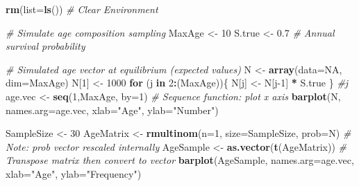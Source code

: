 \documentclass[
]{krantz}
\makeatletter
\newenvironment{Shaded}{\begin{snugshade}}{\end{snugshade}}
\newcommand{\AttributeTok}[1]{\textcolor[rgb]{0.27,0.27,0.27}{#1}}
\newcommand{\CommentTok}[1]{\textcolor[rgb]{0.37,0.37,0.37}{\textit{#1}}}
\newcommand{\ConstantTok}[1]{\textcolor[rgb]{0.37,0.37,0.37}{#1}}
\newcommand{\ControlFlowTok}[1]{\textcolor[rgb]{0.27,0.27,0.27}{\textbf{#1}}}
\newcommand{\DecValTok}[1]{\textcolor[rgb]{0.06,0.06,0.06}{#1}}
\newcommand{\FloatTok}[1]{\textcolor[rgb]{0.06,0.06,0.06}{#1}}
\newcommand{\FunctionTok}[1]{\textcolor[rgb]{0.27,0.27,0.27}{\textbf{#1}}}
\newcommand{\NormalTok}[1]{#1}
\newcommand{\OtherTok}[1]{\textcolor[rgb]{0.37,0.37,0.37}{#1}}
\newcommand{\SpecialCharTok}[1]{\textcolor[rgb]{0.43,0.43,0.43}{\textbf{#1}}}
\newcommand{\StringTok}[1]{\textcolor[rgb]{0.5,0.5,0.5}{#1}}
\newenvironment{kframe}{%
\medskip{}
\setlength{\fboxsep}{.8em}
 \def\at@end@of@kframe{}%
 \ifinner\ifhmode%
  \def\at@end@of@kframe{\end{minipage}}%
  \begin{minipage}{\columnwidth}%
 \fi\fi%
 \def\FrameCommand##1{\hskip\@totalleftmargin \hskip-\fboxsep
 \colorbox{shadecolor}{##1}\hskip-\fboxsep
     \hskip-\linewidth \hskip-\@totalleftmargin \hskip\columnwidth}%
 \MakeFramed {\advance\hsize-\width
   \@totalleftmargin\z@ \linewidth\hsize
   \@setminipage}}%
 {\par\unskip\endMakeFramed%
 \at@end@of@kframe}
\renewenvironment{Shaded}{\begin{kframe}}{\end{kframe}}
\makeatother
\begin{document}
\begin{Shaded}
\begin{Highlighting}[]
\FunctionTok{rm}\NormalTok{(}\AttributeTok{list=}\FunctionTok{ls}\NormalTok{()) }\CommentTok{\# Clear Environment}

\CommentTok{\# Simulate age composition sampling}
\NormalTok{MaxAge }\OtherTok{\textless{}{-}} \DecValTok{10}
\NormalTok{S.true }\OtherTok{\textless{}{-}} \FloatTok{0.7} \CommentTok{\# Annual survival probability}

\CommentTok{\# Simulated age vector at equilibrium (expected values)}
\NormalTok{N }\OtherTok{\textless{}{-}} \FunctionTok{array}\NormalTok{(}\AttributeTok{data=}\ConstantTok{NA}\NormalTok{, }\AttributeTok{dim=}\NormalTok{MaxAge)}
\NormalTok{N[}\DecValTok{1}\NormalTok{] }\OtherTok{\textless{}{-}} \DecValTok{1000}
\ControlFlowTok{for}\NormalTok{ (j }\ControlFlowTok{in} \DecValTok{2}\SpecialCharTok{:}\NormalTok{(MaxAge))\{}
\NormalTok{  N[j] }\OtherTok{\textless{}{-}}\NormalTok{ N[j}\DecValTok{{-}1}\NormalTok{] }\SpecialCharTok{*}\NormalTok{ S.true}
\NormalTok{\} }\CommentTok{\#j}
\NormalTok{age.vec }\OtherTok{\textless{}{-}} \FunctionTok{seq}\NormalTok{(}\DecValTok{1}\NormalTok{,MaxAge, }\AttributeTok{by=}\DecValTok{1}\NormalTok{)  }\CommentTok{\# Sequence function: plot x axis}
\FunctionTok{barplot}\NormalTok{(N, }\AttributeTok{names.arg=}\NormalTok{age.vec, }\AttributeTok{xlab=}\StringTok{"Age"}\NormalTok{, }\AttributeTok{ylab=}\StringTok{"Number"}\NormalTok{)}

\NormalTok{SampleSize }\OtherTok{\textless{}{-}} \DecValTok{30}
\NormalTok{AgeMatrix }\OtherTok{\textless{}{-}} \FunctionTok{rmultinom}\NormalTok{(}\AttributeTok{n=}\DecValTok{1}\NormalTok{, }\AttributeTok{size=}\NormalTok{SampleSize, }\AttributeTok{prob=}\NormalTok{N)}
\CommentTok{\# Note: prob vector rescaled internally}
\NormalTok{AgeSample }\OtherTok{\textless{}{-}} \FunctionTok{as.vector}\NormalTok{(}\FunctionTok{t}\NormalTok{(AgeMatrix)) }
  \CommentTok{\# Transpose matrix then convert to vector}
\FunctionTok{barplot}\NormalTok{(AgeSample, }\AttributeTok{names.arg=}\NormalTok{age.vec, }\AttributeTok{xlab=}\StringTok{"Age"}\NormalTok{, }\AttributeTok{ylab=}\StringTok{"Frequency"}\NormalTok{)}
\end{Highlighting}
\end{Shaded}
\end{document}
